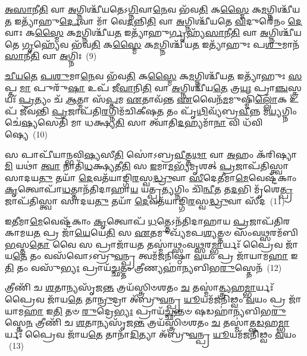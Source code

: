 \-\ul{𑌅}\-\-\ul{𑌸𑌾}\-𑌨𑍀\-\ul{𑌤𑌿} 𑌵𑌾 \ul{𑌅}\-𑌗𑍍𑌨𑌿𑌶𑍍𑌚𑍀᳴𑌯𑌤𑍇\-𑌽\-\ul{𑌗𑍍𑌨𑌿}\-𑌵𑌾\-\ul{𑌨𑍇}\-𑌵 𑌭᳴𑌵\-\ul{𑌤𑌿} 𑌕\-\ul{𑌸𑍍𑌮𑍈} 𑌕\-\ul{𑌮}\-𑌗𑍍𑌨𑌿𑌶𑍍𑌚𑍀᳴𑌯\-\ul{𑌤} 𑌇𑌤𑍍𑌯𑌾᳴𑌹𑍁\-\ul{𑌰𑍍𑌦𑍇}\-𑌵𑌾 𑌮𑌾᳴ 𑌵𑍇\-\ul{𑌦}\-𑌨𑍍𑌨𑌿\-\ul{𑌤𑌿} 𑌵𑌾 \ul{𑌅}\-𑌗𑍍𑌨𑌿𑌶𑍍𑌚𑍀᳴𑌯𑌤𑍇 \ul{𑌵𑌿}\-𑌦𑍁𑌰𑍇᳴𑌨𑌂 \ul{𑌦𑍇}\-𑌵𑌾𑌃 𑌕\-\ul{𑌸𑍍𑌮𑍈} 𑌕\-\ul{𑌮}\-𑌗𑍍𑌨𑌿𑌶𑍍𑌚𑍀᳴𑌯\-\ul{𑌤} 𑌇𑌤𑍍𑌯𑌾᳴𑌹𑍁\-\ul{𑌰𑍍𑌗𑍃}\-𑌹𑍍𑌯᳴\-\ul{𑌸𑌾}\-𑌨𑍀\-\ul{𑌤𑌿} 𑌵𑌾 \ul{𑌅}\-𑌗𑍍𑌨𑌿𑌶𑍍𑌚𑍀᳴𑌯𑌤𑍇 \ul{𑌗𑍃}\-𑌹𑍍𑌯𑍇᳴𑌵 𑌭᳴𑌵\-\ul{𑌤𑌿} 𑌕\-\ul{𑌸𑍍𑌮𑍈} 𑌕\-\ul{𑌮}\-𑌗𑍍𑌨𑌿𑌶𑍍𑌚𑍀᳴𑌯\-\ul{𑌤} 𑌇𑌤𑍍𑌯𑌾᳴𑌹𑍁𑌃 𑌪\-\ul{𑌶𑍁}\-𑌮𑌾𑌨᳴\-\ul{𑌸𑌾}\-𑌨𑍀\-\ul{𑌤𑌿} 𑌵𑌾 \ul{𑌅}\-𑌗𑍍𑌨𑌿𑌃~(9)

\-\ul{𑌚𑍀}\-\-\ul{𑌯}\-\-\ul{𑌤𑍇} \ul{𑌪}\-\-\ul{𑌶𑍁}\-𑌮𑌾\-\ul{𑌨𑍇}\-𑌵 𑌭᳴𑌵\-\ul{𑌤𑌿} 𑌕\-\ul{𑌸𑍍𑌮𑍈} 𑌕\-\ul{𑌮}\-𑌗𑍍𑌨𑌿𑌶𑍍𑌚𑍀᳴𑌯\-\ul{𑌤} 𑌇𑌤𑍍𑌯𑌾᳴𑌹𑍁𑌃 \ul{𑌸}\-𑌪𑍍𑌤 \ul{𑌮𑌾} 𑌪𑍁𑌰𑍁᳴\-\ul{𑌷𑌾} 𑌉𑌪᳴ 𑌜𑍀\-\ul{𑌵𑌾}\-𑌨𑌿\-\ul{𑌤𑌿} 𑌵𑌾 \ul{𑌅}\-𑌗𑍍𑌨𑌿𑌶𑍍𑌚𑍀᳴𑌯\-\ul{𑌤𑍇} 𑌤𑍍𑌰\-\ul{𑌯𑌃} 𑌪𑍍𑌰𑌾\-\ul{𑌞𑍍𑌚}\-𑌸𑍍𑌤𑍍𑌰𑌯𑌃᳴ \ul{𑌪𑍍𑌰}\-𑌤𑍍𑌯𑌂 𑌚᳴ \ul{𑌆}\-𑌤𑍍𑌮𑌾 𑌸᳴\-\ul{𑌪𑍍𑌤}\-𑌮 \ul{𑌏}\-𑌤𑌾𑌵᳴𑌨𑍍𑌤 \ul{𑌏}\-𑌵𑍈𑌨᳴\-\ul{𑌮}\-𑌮𑍁𑌷𑍍𑌮𑌿᳴\-\ul{𑌲𑍍𑌲𑍋𑌁}\-𑌕 𑌉𑌪᳴ 𑌜𑍀𑌵𑌨𑍍𑌤𑌿 \ul{𑌪𑍍𑌰}\-𑌜𑌾𑌪᳴𑌤𑌿\-\ul{𑌰}\-𑌗𑍍𑌨𑌿𑌮᳴𑌚𑌿𑌕𑍀𑌷\-\ul{𑌤} 𑌤𑌂 𑌪𑍃᳴\-\ul{𑌥𑌿}\-𑌵𑍍𑌯᳴𑌬𑍍𑌰\-\ul{𑌵𑍀}\-𑌨𑍍𑌨 𑌮\-\ul{𑌯𑍍𑌯}\-𑌗𑍍𑌨𑌿𑌂 𑌚𑍇॑\-\ul{𑌷𑍍𑌯}\-𑌸𑍇𑌤𑌿᳴ 𑌮𑌾 𑌧𑌕𑍍𑌷𑍍𑌯\-\ul{𑌤𑌿} 𑌸𑌾 𑌤𑍍𑌵𑌾᳴𑌤𑌿\-\ul{𑌦}\-𑌹𑍍𑌯𑌮𑌾᳴\-\ul{𑌨𑌾} 𑌵𑌿 𑌧᳴𑌵𑌿𑌷𑍍𑌯𑍇~(10)

𑌸 𑌪𑌾𑌪𑍀᳴𑌯𑌾𑌨𑍍𑌭𑌵𑌿\-\ul{𑌷𑍍𑌯}\-𑌸𑍀\-\ul{𑌤𑌿} 𑌸𑍋॑\-𑌽𑌬𑍍𑌰\-\ul{𑌵𑍀}\-𑌤𑍍𑌤\-\ul{𑌥𑌾} 𑌵𑌾 \ul{𑌅}\-𑌹𑌂 𑌕᳴𑌰𑌿𑌷𑍍𑌯𑌾\-\ul{𑌮𑌿} 𑌯𑌥𑌾॑ \ul{𑌤𑍍𑌵𑌾} 𑌨𑌾𑌤𑌿᳴\-\ul{𑌧}\-𑌕𑍍𑌷𑍍𑌯𑌤𑍀\-\ul{𑌤𑌿} 𑌸 \ul{𑌇}\-𑌮𑌾\-\ul{𑌮}\-𑌭𑍍𑌯᳴𑌮𑍃𑌶𑌤𑍍 \ul{𑌪𑍍𑌰}\-𑌜𑌾𑌪᳴𑌤𑌿𑌸𑍍𑌤𑍍𑌵𑌾 𑌸𑌾𑌦𑌯\-\ul{𑌤𑍁} 𑌤𑌯𑌾᳴ \ul{𑌦𑍇}\-𑌵𑌤᳴𑌯𑌾𑌙𑍍𑌗𑌿\-\ul{𑌰}\-𑌸𑍍𑌵\-\ul{𑌦𑍍𑌧𑍍𑌰𑍁}\-𑌵𑌾 \ul{𑌸𑍀}\-𑌦𑍇\-\ul{𑌤𑍀}\-𑌮𑌾\-\ul{𑌮𑍇}\-𑌵𑍇𑌷𑍍𑌟᳴𑌕𑌾𑌂 \ul{𑌕𑍃}\-𑌤𑍍𑌵𑍋𑌪𑌾᳴\-\ul{𑌧}\-𑌤𑍍𑌤𑌾𑌨᳴𑌤𑌿𑌦𑌾𑌹𑌾\-\ul{𑌯} 𑌯𑌤𑍍𑌪𑍍𑌰\-\ul{𑌤𑍍𑌯}\-𑌗𑍍𑌨𑌿𑌂 𑌚𑌿᳴\-\ul{𑌨𑍍𑌵𑍀}\-𑌤 𑌤\-\ul{𑌦}\-𑌭𑌿 𑌮𑍃᳴𑌶𑍇\-\ul{𑌤𑍍𑌪𑍍𑌰}\-𑌜𑌾𑌪᳴𑌤𑌿𑌸𑍍𑌤𑍍𑌵𑌾 𑌸𑌾𑌦𑌯\-\ul{𑌤𑍁} 𑌤𑌯𑌾᳴ \ul{𑌦𑍇}\-𑌵𑌤᳴𑌯𑌾𑌙𑍍𑌗𑌿\-\ul{𑌰}\-𑌸𑍍𑌵\-\ul{𑌦𑍍𑌧𑍍𑌰𑍁}\-𑌵𑌾 𑌸𑍀᳴𑌦~(11)

𑌇\-\ul{𑌤𑍀}\-𑌮𑌾\-\ul{𑌮𑍇}\-𑌵𑍇𑌷𑍍𑌟᳴𑌕𑌾𑌂 \ul{𑌕𑍃}\-𑌤𑍍𑌵𑍋𑌪᳴ \ul{𑌧}\-𑌤𑍍𑌤𑍇\-𑌽𑌨᳴𑌤𑌿𑌦𑌾𑌹𑌾𑌯 \ul{𑌪𑍍𑌰}\-𑌜𑌾𑌪᳴𑌤𑌿𑌰𑌕𑌾𑌮𑌯\-\ul{𑌤} 𑌪𑍍𑌰 𑌜𑌾᳴\-\ul{𑌯𑍇}\-𑌯𑍇\-\ul{𑌤𑌿} 𑌸 \ul{𑌏}\-𑌤𑌮𑍁𑌖𑍍𑌯᳴𑌮𑌪\-\ul{𑌶𑍍𑌯}\-𑌤𑍍𑌤𑍞 𑌸𑌂᳴𑌵\-\ul{𑌥𑍍𑌸}\-𑌰𑌮᳴𑌬𑌿\-\ul{𑌭}\-𑌸𑍍𑌤\-\ul{𑌤𑍋} 𑌵𑍈 𑌸 𑌪𑍍𑌰𑌾𑌜𑌾᳴𑌯\-\ul{𑌤} 𑌤𑌸𑍍𑌮𑌾॑𑌥𑍍𑌸𑌂𑌵\-\ul{𑌥𑍍𑌸}\-𑌰\-\ul{𑌮𑍍𑌭𑌾}\-𑌰𑍍𑌯𑌃᳴ 𑌪𑍍𑌰𑍈𑌵 𑌜𑌾᳴𑌯\-\ul{𑌤𑍇} 𑌤𑌂 𑌵𑌸᳴𑌵𑍋\-𑌽𑌬𑍍𑌰𑍁\-\ul{𑌵}\-𑌨𑍍𑌪𑍍𑌰 𑌤𑍍𑌵𑌮᳴𑌜𑌨𑌿𑌷𑍍𑌠𑌾 \ul{𑌵}\-𑌯𑌂 𑌪𑍍𑌰 𑌜𑌾᳴𑌯𑌾𑌮\-\ul{𑌹𑌾} 𑌇\-\ul{𑌤𑌿} 𑌤𑌂 𑌵𑌸𑍁᳴\-\ul{𑌭𑍍𑌯𑌃} 𑌪𑍍𑌰𑌾𑌯᳴\-\ul{𑌚𑍍𑌛}\-𑌤𑍍𑌤𑌂 𑌤𑍍𑌰𑍀𑌣𑍍𑌯𑌹𑌾॑𑌨𑍍𑌯𑌬𑌿𑌭\-\ul{𑌰𑍁}\-𑌸𑍍𑌤𑍇𑌨᳴~(12)

𑌤𑍍𑌰𑍀𑌣𑌿᳴ 𑌚 \ul{𑌶}\-𑌤𑌾𑌨𑍍𑌯𑌸𑍃᳴𑌜\-\ul{𑌨𑍍𑌤} 𑌤𑍍𑌰𑌯᳴𑌸𑍍𑌤𑍍𑌰𑌿𑍞𑌶𑌤𑌂 \ul{𑌚} 𑌤𑌸𑍍𑌮𑌾॑\-\ul{𑌤𑍍𑌤𑍍𑌰𑍍𑌯}\-𑌹\-\ul{𑌮𑍍𑌭𑌾}\-𑌰𑍍𑌯𑌃᳴ 𑌪𑍍𑌰𑍈𑌵 𑌜𑌾᳴𑌯\-\ul{𑌤𑍇} 𑌤𑌾\-\ul{𑌨𑍍𑌰𑍁}\-𑌦𑍍𑌰𑌾 𑌅᳴𑌬𑍍𑌰𑍁\-\ul{𑌵}\-𑌨𑍍𑌪𑍍𑌰 \ul{𑌯𑍂}\-𑌯𑌮᳴𑌜𑌨𑌿𑌢𑍍𑌵𑌂 \ul{𑌵}\-𑌯𑌂 𑌪𑍍𑌰 𑌜𑌾᳴𑌯𑌾𑌮\-\ul{𑌹𑌾} 𑌇\-\ul{𑌤𑌿} 𑌤𑍞 \ul{𑌰𑍁}\-𑌦𑍍𑌰𑍇\-\ul{𑌭𑍍𑌯𑌃} 𑌪𑍍𑌰𑌾𑌯᳴\-\ul{𑌚𑍍𑌛}\-𑌨𑍍𑌤𑍞 𑌷𑌡𑌹𑌾॑𑌨𑍍𑌯𑌬𑌿𑌭\-\ul{𑌰𑍁}\-𑌸𑍍𑌤𑍇\-\ul{𑌨} 𑌤𑍍𑌰𑍀𑌣𑌿᳴ 𑌚 \ul{𑌶}\-𑌤𑌾𑌨𑍍𑌯𑌸𑍃᳴𑌜\-\ul{𑌨𑍍𑌤} 𑌤𑍍𑌰𑌯᳴𑌸𑍍𑌤𑍍𑌰𑌿𑍞𑌶𑌤𑌂 \ul{𑌚} 𑌤𑌸𑍍𑌮𑌾॑𑌤𑍍𑌷\-\ul{𑌡}\-𑌹\-\ul{𑌮𑍍𑌭𑌾}\-𑌰𑍍𑌯𑌃᳴ 𑌪𑍍𑌰𑍈𑌵 𑌜𑌾᳴𑌯\-\ul{𑌤𑍇} 𑌤𑌾𑌨𑌾᳴\-\ul{𑌦𑌿}\-𑌤𑍍𑌯𑌾 𑌅᳴𑌬𑍍𑌰𑍁\-\ul{𑌵}\-𑌨𑍍𑌪𑍍𑌰 \ul{𑌯𑍂}\-𑌯𑌮᳴𑌜𑌨𑌿𑌢𑍍𑌵𑌂 \ul{𑌵}\-𑌯𑌂 ~(13)

